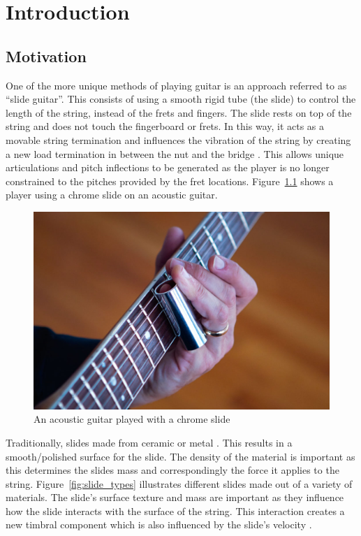 \documentclass[../main.tex]{subfiles}
\begin{document}
\chapter{Introduction}
\section{Motivation}
One of the more unique methods of playing guitar is an approach referred to as “slide guitar”. This consists of using a smooth rigid tube (the slide) to control the length of the string, instead of the frets and fingers. The slide rests on top of the string and does not touch the fingerboard or frets. In this way, it acts as a movable string termination and influences the vibration of the string by creating a new load termination in between the nut and the bridge . This allows unique articulations and pitch inflections to be generated as the player is no longer constrained to the pitches provided by the fret locations. Figure~\ref{fig:acoustic_chrome} shows a player using a chrome slide on an acoustic guitar.

\begin{figure}[h]
    \centering
    \includegraphics[scale=.30]{./images/pictures/Slide-guitar-1024x683.jpg}
    \caption{An acoustic guitar played with a chrome slide}
    \label{fig:acoustic_chrome}
\end{figure}

Traditionally, slides made from ceramic or metal . This results in a smooth/polished surface for the slide. The density of the material is important as this determines the slides mass and correspondingly the force it applies to the string. Figure~\ref{fig:slide_types} illustrates different slides made out of a variety of materials. The slide's surface texture and mass are important as they influence how the slide interacts with the surface of the string. This interaction creates a new timbral component which is also influenced by the slide’s velocity .
\end{document}
